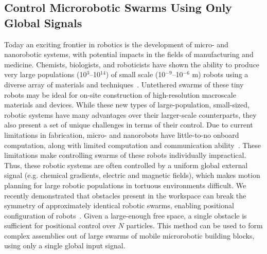 \subsection{Control Microrobotic Swarms Using Only Global Signals}
Today an exciting frontier in robotics is the development of micro- and nanorobotic systems, with potential impacts in the fields of manufacturing and medicine. 
Chemists, biologists, and roboticists have shown the ability to produce very large populations (10$^3$--10$^{14}$) of small scale (10$^{-9}$--10$^{-6}$ m) robots using a diverse array of materials and techniques~\cite{rubenstein2012kilobot,ou2013motion,chiang2011toward}. 
Untethered swarms of these tiny robots may be ideal for on-site construction of high-resolution macroscale materials and devices. 
While these new types of large-population, small-sized, robotic systems have many advantages over their larger-scale counterparts, they also present a set of unique challenges in terms of their control. 
Due to  current limitations in fabrication, micro- and nanorobots have little-to-no onboard computation, along with limited computation and communication ability~\cite{chiang2011toward, chowdhury2015controlling, donald2013planning}.  
These limitations make controlling swarms of these robots individually impractical. 
Thus, these robotic systems are often controlled by a uniform global external signal (e.g. chemical gradients, electric and magnetic fields), which makes motion planning for large robotic populations in tortuous environments difficult. 
We recently demonstrated that obstacles present in the workspace can break the symmetry of approximately identical robotic swarms, enabling positional configuration of robots~\cite{becker2013massive}. 
 Given a large-enough free space, a single obstacle is sufficient for positional control over $N$ particles.  
This method can be used to form complex assemblies out of large swarms of mobile microrobotic building blocks, using only a single global input signal.

